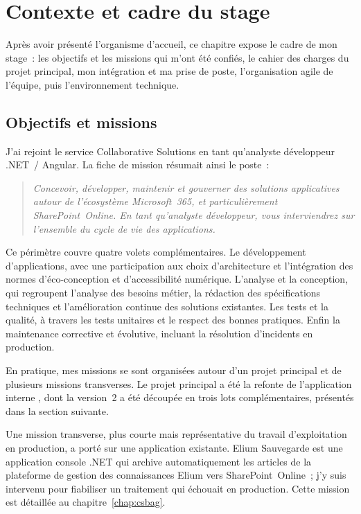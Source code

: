 \chapter{Contexte et cadre du stage}
\label{chap:contexte}
Après avoir présenté l'organisme d'accueil, ce chapitre expose le cadre de mon
stage~: les objectifs et les missions qui m'ont été confiés, le cahier des
charges du projet principal, mon intégration et ma prise de poste,
l'organisation agile de l'équipe, puis l'environnement technique.

\section{Objectifs et missions}
\label{sec:objectifs}
J'ai rejoint le service Collaborative Solutions en tant qu'analyste développeur
.NET~/ Angular. La fiche de mission résumait ainsi le poste~:
\begin{quote}\itshape
Concevoir, développer, maintenir et gouverner des solutions applicatives
autour de l'écosystème Microsoft~365, et particulièrement SharePoint~Online.
En tant qu'analyste développeur, vous interviendrez sur l'ensemble du cycle de
vie des applications.
\end{quote}
Ce périmètre couvre quatre volets complémentaires. Le développement
d'applications, avec une participation aux choix d'architecture et
l'intégration des normes d'éco-conception et d'accessibilité numérique.
L'analyse et la conception, qui regroupent l'analyse des besoins métier, la
rédaction des spécifications techniques et l'amélioration continue des
solutions existantes. Les tests et la qualité, à travers les tests unitaires
et le respect des bonnes pratiques. Enfin la maintenance corrective et
évolutive, incluant la résolution d'incidents en production.

En pratique, mes missions se sont organisées autour d'un projet principal et de
plusieurs missions transverses. Le projet principal a été la refonte de
l'application interne \csbag, dont la version~2 a été découpée en trois lots
complémentaires, présentés dans la section suivante.

Une mission transverse, plus courte mais représentative du travail
d'exploitation en production, a porté sur une application existante. Elium
Sauvegarde est une application console .NET qui archive automatiquement les
articles de la plateforme de gestion des connaissances Elium vers
SharePoint~Online~; j'y suis intervenu pour fiabiliser un traitement qui
échouait en production. Cette mission est détaillée au
chapitre~\ref{chap:csbag}.

